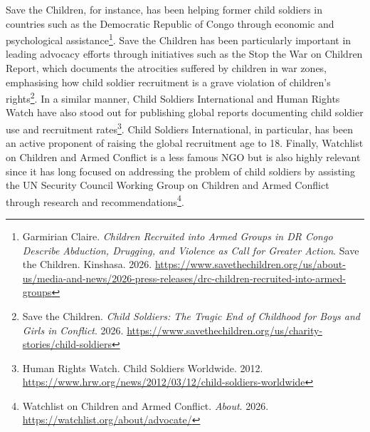 Save the Children, for instance, has been helping former child soldiers in countries such as the Democratic Republic of Congo through economic and psychological assistance\footnote{Garmirian Claire. \emph{Children Recruited into Armed Groups in DR Congo Describe Abduction, Drugging, and Violence as Call for Greater Action}. Save the Children. Kinshasa. 2026. \url{https://www.savethechildren.org/us/about-us/media-and-news/2026-press-releases/drc-children-recruited-into-armed-groups}}. Save the Children has been particularly important in leading advocacy efforts through initiatives such as the Stop the War on Children Report, which documents the atrocities suffered by children in war zones, emphasising how child soldier recruitment is a grave violation of children’s rights\footnote{Save the Children. \emph{Child Soldiers: The Tragic End of Childhood for Boys and Girls in Conflict}. 2026. \url{https://www.savethechildren.org/us/charity-stories/child-soldiers}}. In a similar manner, Child Soldiers International and Human Rights Watch have also stood out for publishing global reports documenting child soldier use and recruitment rates\footnote{Human Rights Watch. Child Soldiers Worldwide. 2012. \url{https://www.hrw.org/news/2012/03/12/child-soldiers-worldwide}}. Child Soldiers International, in particular, has been an active proponent of raising the global recruitment age to 18. Finally, Watchlist on Children and Armed Conflict is a less famous NGO but is also highly relevant since it has long focused on addressing the problem of child soldiers by assisting the UN Security Council Working Group on Children and Armed Conflict through research and recommendations\footnote{Watchlist on Children and Armed Conflict. \emph{About}. 2026. \url{https://watchlist.org/about/advocate/}}.
